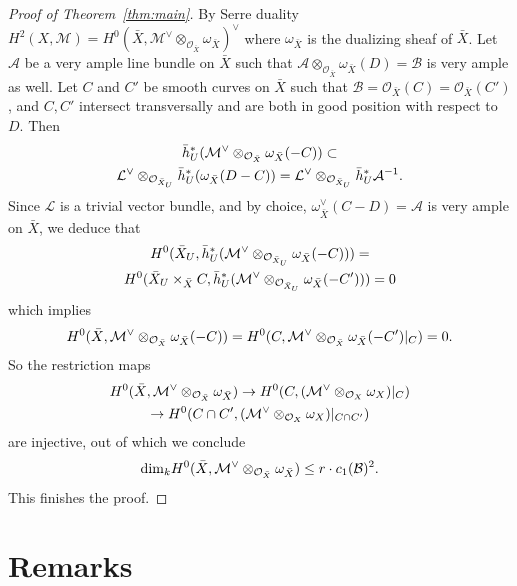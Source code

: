 \documentclass[12pt]{amsart}
\theoremstyle{plain}
\theoremstyle{definition}
\numberwithin{thm}{section}
\newcommand{\ml}[2]{\begin{multline}\label{#1}#2 \end{multline}}
\newcommand{\ga}[2]{\begin{gather}\label{#1}#2 \end{gather}}
\newcommand{\sA}{{\mathcal A}}
\newcommand{\sB}{{\mathcal B}}
\newcommand{\sL}{{\mathcal L}}
\newcommand{\sM}{{\mathcal M}}
\newcommand{\sO}{{\mathcal O}}
\numberwithin{equation}{section}
\begin{document}
\begin{proof}[Proof of Theorem~\ref{thm:main}]
By  Serre duality $ H^2(X, \sM)=  H^0(\bar X, \sM^\vee \otimes_{\sO_{\bar X}}  \omega_{\bar X})^\vee$ where $\omega_{\bar X}$ is the dualizing sheaf of $\bar X$. 
Let $\sA$ be a very ample line bundle on $\bar X$ such that 
 $\sA\otimes_{\sO_{\bar X}}\omega_{\bar X}(D)=\sB$ is very ample as well. 
  Let $C$  and $C'$ be  smooth curves on $\bar X$ such that 
  $\sB=\sO_{\bar X}(C)=\sO_{\bar X}(C')$, and $C, C'$ intersect transversally and are both in good position with respect to $D$. Then  
  \ml{}{
 \bar h_U^*(\sM^\vee \otimes_{\sO_{\bar X}} \omega_{\bar X}(-C))\subset \\
\sL^{\vee}\otimes_{\sO_{\bar X_U}} 
\bar h_U^*(\omega_{\bar X}(D-C))=\sL^{\vee}\otimes_{\sO_{\bar X_U}}\bar h_U^*\sA^{-1}. \notag}
Since $\sL$ is a trivial vector bundle, and by choice, $\omega_{\bar X}^{\vee}(C-D)=\sA$ is very ample on $\bar{X}$, we deduce that 
\ml{}{ H^0(\bar X_U,   \bar h_U^*(\sM^\vee \otimes_{\sO_{\bar X_U}} \omega_{\bar X}(-C)))=\\
H^0(\bar X_U\times_{\bar X}  C,   \bar h_U^*(\sM^\vee \otimes_{\sO_{\bar X_U}} \omega_{\bar X}(-C')))
=
0\notag}
which implies
\ga{}{ H^0(\bar X, \sM^\vee \otimes_{\sO_{\bar X}} \omega_{\bar X}(-C))= H^0(C, \sM^\vee \otimes_{\sO_{\bar X}} \omega_{\bar X}(-C')|_C)=
0. \notag}
So  the restriction maps
\ml{}{ H^0(\bar X, \sM^\vee\otimes_{\sO_{\bar X}} \omega_{\bar X})  \to 
H^0(C, (\sM^\vee\otimes_{\sO_X} \omega_X)|_C) \\ \to H^0(C\cap C', (\sM^\vee\otimes_{\sO_X} \omega_X)|_{C\cap C'}) 
\notag}
 are injective, out of which we conclude 
 \ga{}{{\rm dim}_{k} H^0(\bar X, \sM^\vee\otimes_{\sO_{\bar X}} \omega_{\bar X}) \le r\cdot c_1(\sB)^2.  \notag }
 This finishes the proof. 
 
 
 
 



\end{proof}

\section{Remarks} \label{sec:rmk}
\end{document}

